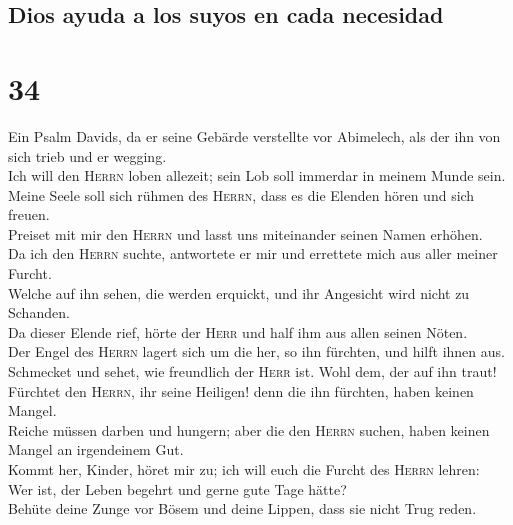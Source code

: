 \hypertarget{dios-ayuda-a-los-suyos-en-cada-necesidad}{%
\subsection{Dios ayuda a los suyos en cada
necesidad}\label{dios-ayuda-a-los-suyos-en-cada-necesidad}}

\hypertarget{section-33}{%
\section{34}\label{section-33}}

 Ein Psalm Davids, da er seine Gebärde verstellte vor
Abimelech, als der ihn von sich trieb und er wegging.\\
 Ich will den \textsc{Herrn} loben allezeit; sein Lob soll
immerdar in meinem Munde sein.\\
 Meine Seele soll sich rühmen des \textsc{Herrn}, dass es
die Elenden hören und sich freuen.\\
 Preiset mit mir den \textsc{Herrn} und lasst uns
miteinander seinen Namen erhöhen.\\
 Da ich den \textsc{Herrn} suchte, antwortete er mir und
errettete mich aus aller meiner Furcht.\\
 Welche auf ihn sehen, die werden erquickt, und ihr
Angesicht wird nicht zu Schanden.\\
 Da dieser Elende rief, hörte der \textsc{Herr} und half
ihm aus allen seinen Nöten.\\
 Der Engel des \textsc{Herrn} lagert sich um die her, so
ihn fürchten, und hilft ihnen aus.\\
 Schmecket und sehet, wie freundlich der \textsc{Herr}
ist. Wohl dem, der auf ihn traut!\\
 Fürchtet den \textsc{Herrn}, ihr seine Heiligen! denn
die ihn fürchten, haben keinen Mangel.\\
 Reiche müssen darben und hungern; aber die den
\textsc{Herrn} suchen, haben keinen Mangel an irgendeinem Gut.\\
 Kommt her, Kinder, höret mir zu; ich will euch die
Furcht des \textsc{Herrn} lehren:\\
 Wer ist, der Leben begehrt und gerne gute Tage hätte?\\
 Behüte deine Zunge vor Bösem und deine Lippen, dass sie
nicht Trug reden.\\
